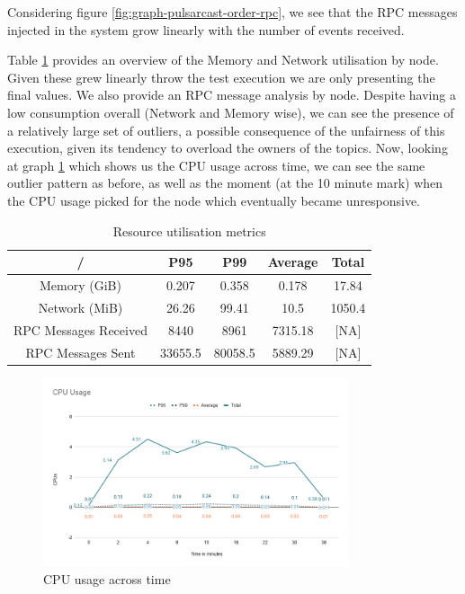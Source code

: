Considering figure \ref{fig:graph-pulsarcast-order-rpc}, we see that the RPC
messages injected in the system grow linearly with the number of events
received.

Table \ref{table:pulsarcast-order} provides an overview of the Memory and
Network utilisation by node. Given these grew linearly throw the test execution
we are only presenting the final values. We also provide an RPC message
analysis by node. Despite having a low consumption overall (Network and Memory
wise), we can see the presence of a relatively large set of outliers, a
possible consequence of the unfairness of this execution, given its tendency to
overload the owners of the topics. Now, looking at graph
\ref{fig:graph-pulsarcast-order-cpu} which shows us the CPU usage across time,
we can see the same outlier pattern as before, as well as the moment (at the 10
minute mark) when the CPU usage picked for the node which eventually became
unresponsive.

\begin{table}
\caption{Resource utilisation metrics}
\label{table:pulsarcast-order}
  \begin{center}
   \begin{tabular}{|c| c c c c|} 
   \hline
   / & P95 & P99 & Average & Total \\ [0.5ex] 
   \hline\hline
   Memory (GiB) & 0.207 & 0.358 & 0.178 & 17.84 \\
   \hline
   Network (MiB) & 26.26 & 99.41 & 10.5 & 1050.4 \\
   \hline
   RPC Messages Received & 8440 & 8961 & 7315.18 & [NA] \\
   \hline
   RPC Messages Sent & 33655.5 & 80058.5 & 5889.29 & [NA] \\ [1ex] 
   \hline
  \end{tabular}
  \end{center}
\end{table}

\begin{figure}[hb!]
  \centering
  \includegraphics[width=0.8\textwidth]{img/graph-pulsarcast-order-cpu.png}
  \caption{CPU usage across time}
  \label{fig:graph-pulsarcast-order-cpu}
\end{figure}

